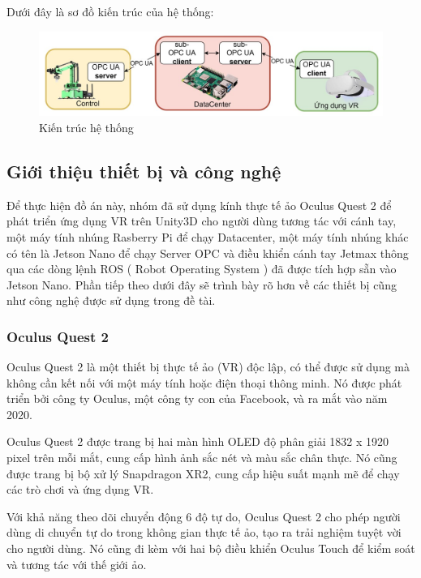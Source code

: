 Dưới đây là sơ đồ kiến trúc của hệ thống:
\begin{figure}[!h]
    \centering
    \includegraphics[width=1\textwidth]{Images/architect_1.jpg}
    \caption{Kiến trúc hệ thống}
    \label{fig:comp_mqtt}
\end{figure}
\subsection{Giới thiệu thiết bị và công nghệ}
Để thực hiện đồ án này, nhóm đã sử dụng kính thực tế ảo Oculus Quest 2 để phát triển ứng dụng VR trên Unity3D cho người dùng tương tác với cánh tay, một máy tính nhúng Rasberry Pi để chạy Datacenter, một máy tính nhúng khác có tên là Jetson Nano để chạy Server OPC và điều khiển cánh tay Jetmax thông qua các dòng lệnh ROS ( Robot Operating System ) đã được tích hợp sẵn vào Jetson Nano. Phần tiếp theo dưới đây sẽ trình bày rõ hơn về các thiết bị cũng như công nghệ được sử dụng trong đề tài.
\subsubsection{Oculus Quest 2}
Oculus Quest 2 là một thiết bị thực tế ảo (VR) độc lập, có thể được sử dụng mà không cần kết nối với một máy tính hoặc điện thoại thông minh. Nó được phát triển bởi công ty Oculus, một công ty con của Facebook, và ra mắt vào năm 2020.

Oculus Quest 2 được trang bị hai màn hình OLED độ phân giải 1832 x 1920 pixel trên mỗi mắt, cung cấp hình ảnh sắc nét và màu sắc chân thực. Nó cũng được trang bị bộ xử lý Snapdragon XR2, cung cấp hiệu suất mạnh mẽ để chạy các trò chơi và ứng dụng VR.

Với khả năng theo dõi chuyển động 6 độ tự do, Oculus Quest 2 cho phép người dùng di chuyển tự do trong không gian thực tế ảo, tạo ra trải nghiệm tuyệt vời cho người dùng. Nó cũng đi kèm với hai bộ điều khiển Oculus Touch để kiểm soát và tương tác với thế giới ảo.

